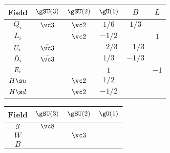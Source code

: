 \vspace{-23pt}

\begin{center}
\begin{tabular}[t]{|c|ccc|c|c|}\hline
 Field   & $\gSU(3)$     & $\gSU(2)$ & $\gU(1)$ & $B$    & $L$  \\\hline
 $Q_i$   & $\vc 3$       & $\vc2$  & $ 1/6$ &  $1/3$ &      \\\hline
 $L_i$   &               & $\vc2$  & $-1/2$ &        &  $1$ \\\hline
 ${\bar U}_i$ & $\bar{\vc 3}$ &         & $-2/3$ & $-1/3$ &      \\\hline
 ${\bar D}_i$ & $\bar{\vc 3}$ &         & $ 1/3$ & $-1/3$ &      \\\hline
 ${\bar E}_i$ &               &         & $ 1  $ &        & $-1$ \\\hline
 $\Hu$   &               & $\vc2$  & $ 1/2$ &        &      \\\hline
 $\Hd$   &               & $\vc2$  & $-1/2$ &        &      \\\hline
\end{tabular}\hspace{2zw}
\begin{tabular}[t]{|c|ccc|}\hline
 Field   & $\gSU(3)$     & $\gSU(2)$ & $\gU(1)$ \\\hline
 $g$     & $\vc 8$       &         &        \\\hline
 $W$     &               & $\vc3$  &        \\\hline
 $B$     &               &         &        \\\hline
\end{tabular}
\end{center}

